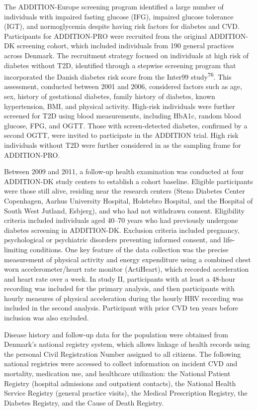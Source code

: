 \documentclass[
  letterpaper,
  headsepline=true,
  open=any]{scrbook}
\begin{document}
The ADDITION-Europe screening program identified a large number of
individuals with impaired fasting glucose (IFG), impaired glucose
tolerance (IGT), and normoglycemia despite having risk factors for
diabetes and CVD. Participants for ADDITION-PRO were recruited from the
original ADDITION-DK screening cohort, which included individuals from
190 general practices across Denmark. The recruitment strategy focused
on individuals at high risk of diabetes without T2D, identified through
a stepwise screening program that incorporated the Danish diabetes risk
score from the Inter99 study\textsuperscript{76}. This assessment,
conducted between 2001 and 2006, considered factors such as age, sex,
history of gestational diabetes, family history of diabetes, known
hypertension, BMI, and physical activity. High-risk individuals were
further screened for T2D using blood measurements, including HbA1c,
random blood glucose, FPG, and OGTT. Those with screen-detected
diabetes, confirmed by a second OGTT, were invited to participate in the
ADDITION trial. High risk individuals without T2D were further
considered in as the sampling frame for ADDITION-PRO.

Between 2009 and 2011, a follow-up health examination was conducted at
four ADDITION-DK study centers to establish a cohort baseline. Eligible
participants were those still alive, residing near the research centers
(Steno Diabetes Center Copenhagen, Aarhus University Hospital, Holstebro
Hospital, and the Hospital of South West Jutland, Esbjerg), and who had
not withdrawn consent. Eligibility criteria included individuals aged
40--70 years who had previously undergone diabetes screening in
ADDITION-DK. Exclusion criteria included pregnancy, psychological or
psychiatric disorders preventing informed consent, and life-limiting
conditions. One key feature of the data collection was the precise
measurement of physical activity and energy expenditure using a combined
chest worn accelerometer/heart rate monitor (ActiHeart), which recorded
acceleration and heart rate over a week. In study II, participants with
at least a 48-hour recording was included for the primary analysis, and
then participants with hourly measures of physical acceleration during
the hourly HRV recording was included in the second analysis.
Participant with prior CVD ten years before inclusion was also excluded.

Disease history and follow-up data for the population were obtained from
Denmark's national registry system, which allows linkage of health
records using the personal Civil Registration Number assigned to all
citizens. The following national registries were accessed to collect
information on incident CVD and mortality, medication use, and
healthcare utilization: the National Patient Registry (hospital
admissions and outpatient contacts), the National Health Service
Registry (general practice visits), the Medical Prescription Registry,
the Diabetes Registry, and the Cause of Death Registry.
\end{document}
